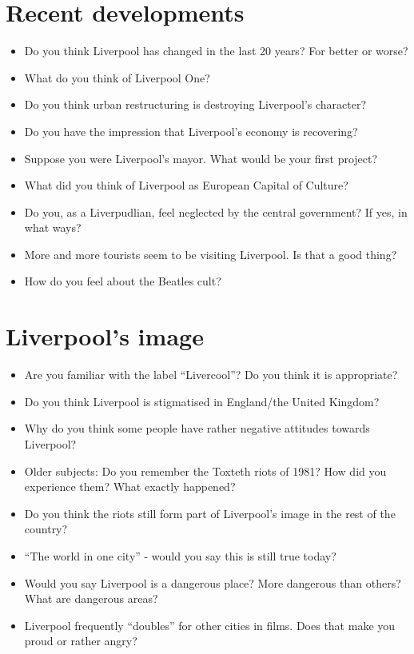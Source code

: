 	\section*{Recent developments}
	\begin{multicols}{2}
		\begin{itemize}
			\item Do you think Liverpool has changed in the last 20 years? For better or worse?
			\item What do you think of Liverpool One?
			\item Do you think urban restructuring is destroying Liverpool's character?
			\item Do you have the impression that Liverpool's economy is recovering?
			\item Suppose you were Liverpool's mayor. What would be your first project?
			\item What did you think of Liverpool as European Capital of Culture?
			\item Do you, as a Liverpudlian, feel neglected by the central government? If yes, in what ways?
			\item More and more tourists seem to be visiting Liverpool. Is that a good thing?
			\item How do you feel about the Beatles cult?
		\end{itemize}
	\end{multicols}
	
	\section*{Liverpool's image}
	\begin{multicols}{2}
		\begin{itemize}
			\item Are you familiar with the label ``Livercool''? Do you think it is appropriate?
			\item Do you think Liverpool is stigmatised in England/the United Kingdom?
			\item Why do you think some people have rather negative attitudes towards Liverpool?
			\item Older subjects: Do you remember the Toxteth riots of 1981? How did you experience them? What exactly happened?
			\item Do you think the riots still form part of Liverpool's image in the rest of the country?
			\item ``The world in one city'' - would you say this is still true today?
			\item Would you say Liverpool is a dangerous place? More dangerous than others? What are dangerous areas?
			\item Liverpool frequently ``doubles'' for other cities in films. Does that make you proud or rather angry?
		\end{itemize}
	\end{multicols}
	
